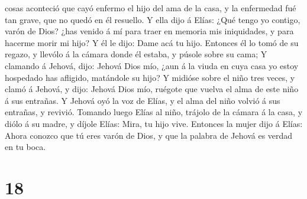 cosas aconteció que cayó enfermo el hijo del ama de la casa, y la
enfermedad fué tan grave, que no quedó en él resuello.  Y
ella dijo á Elías: ¿Qué tengo yo contigo, varón de Dios? ¿has venido á
mí para traer en memoria mis iniquidades, y para hacerme morir mi hijo?
 Y él le dijo: Dame acá tu hijo. Entonces él lo tomó de
su regazo, y llevólo á la cámara donde él estaba, y púsole sobre su
cama;  Y clamando á Jehová, dijo: Jehová Dios mío, ¿aun á
la viuda en cuya casa yo estoy hospedado has afligido, matándole su
hijo?  Y midióse sobre el niño tres veces, y clamó á
Jehová, y dijo: Jehová Dios mío, ruégote que vuelva el alma de este niño
á sus entrañas.  Y Jehová oyó la voz de Elías, y el alma
del niño volvió á sus entrañas, y revivió.  Tomando luego
Elías al niño, trájolo de la cámara á la casa, y diólo á su madre, y
díjole Elías: Mira, tu hijo vive.  Entonces la mujer dijo
á Elías: Ahora conozco que tú eres varón de Dios, y que la palabra de
Jehová es verdad en tu boca.

\hypertarget{section-17}{%
\section{18}\label{section-17}}

